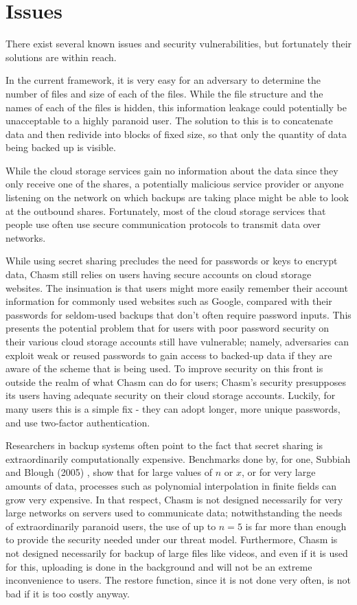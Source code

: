 \documentclass[letterpaper,twocolumn,10pt]{article}
\begin{document}
\section{Issues}

There exist several known issues and security vulnerabilities, but fortunately their solutions are within reach.

In the current framework, it is very easy for an adversary to determine the number of files and size of each of the files. While the file structure and the names of each of the files is hidden, this information leakage could potentially be unacceptable to a highly paranoid user. The solution to this is to concatenate data and then redivide into blocks of fixed size, so that only the quantity of data being backed up is visible.

While the cloud storage services gain no information about the data since they only receive one of the shares, a potentially malicious service provider or anyone listening on the network on which backups are taking place might be able to look at the outbound shares. Fortunately, most of the cloud storage services that people use often use secure communication protocols to transmit data over networks.

While using secret sharing precludes the need for passwords or keys to encrypt data, Chasm still relies on users having secure accounts on cloud storage websites. The insinuation is that users might more easily remember their account information for commonly used websites such as Google, compared with their passwords for seldom-used backups that don't often require password inputs. This presents the potential problem that for users with poor password security on their various cloud storage accounts still have vulnerable; namely, adversaries can exploit weak or reused passwords to gain access to backed-up data if they are aware of the scheme that is being used. To improve security on this front is outside the realm of what Chasm can do for users; Chasm's security presupposes its users having adequate security on their cloud storage accounts. Luckily, for many users this is a simple fix - they can adopt longer, more unique passwords, and use two-factor authentication.

Researchers in backup systems often point to the fact that secret sharing is extraordinarily computationally expensive. Benchmarks done by, for one, Subbiah and Blough (2005) \cite{subbiah}, show that for large values of $n$ or $x$, or for very large amounts of data, processes such as polynomial interpolation in finite fields can grow very expensive. In that respect, Chasm is not designed necessarily for very large networks on servers used to communicate data; notwithstanding the needs of extraordinarily paranoid users, the use of up to $n = 5$ is far more than enough to provide the security needed under our threat model. Furthermore, Chasm is not designed necessarily for backup of large files like videos, and even if it is used for this, uploading is done in the background and will not be an extreme inconvenience to users. The restore function, since it is not done very often, is not bad if it is too costly anyway.
\end{document}
